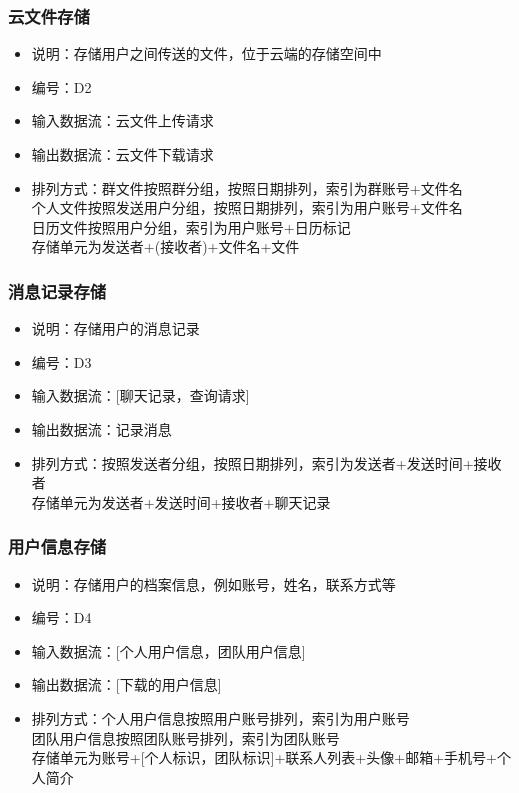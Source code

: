             \subsubsection{云文件存储}
            \begin{itemize}
                \item 说明：存储用户之间传送的文件，位于云端的存储空间中
                \item 编号：D2
                \item 输入数据流：云文件上传请求
                \item 输出数据流：云文件下载请求
                \item 排列方式：群文件按照群分组，按照日期排列，索引为群账号+文件名\\
                               个人文件按照发送用户分组，按照日期排列，索引为用户账号+文件名\\
                               日历文件按照用户分组，索引为用户账号+日历标记\\
                               存储单元为发送者+(接收者)+文件名+文件\\
            \end{itemize}
            \subsubsection{消息记录存储}
            \begin{itemize}
                \item 说明：存储用户的消息记录
                \item 编号：D3
                \item 输入数据流：[聊天记录，查询请求]
                \item 输出数据流：记录消息
                \item 排列方式：按照发送者分组，按照日期排列，索引为发送者+发送时间+接收者\\
                         存储单元为发送者+发送时间+接收者+聊天记录\\
            \end{itemize}
            \subsubsection{用户信息存储}
            \begin{itemize}
                \item 说明：存储用户的档案信息，例如账号，姓名，联系方式等
                \item 编号：D4
                \item 输入数据流：[个人用户信息，团队用户信息]
                \item 输出数据流：[下载的用户信息]
                \item 排列方式：个人用户信息按照用户账号排列，索引为用户账号\\
                               团队用户信息按照团队账号排列，索引为团队账号\\
                               存储单元为账号+[个人标识，团队标识]+联系人列表+头像+邮箱+手机号+个人简介\\
            \end{itemize}
